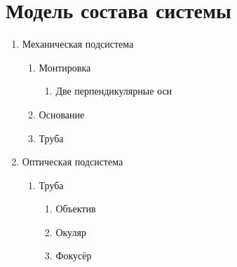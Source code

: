 \section{Модель состава системы}

\begin{enumerate}
\item Механическая подсистема
    \begin{enumerate}[label*=\arabic*.]
    \item Монтировка
        \begin{enumerate}[label*=\arabic*.]
        \item Две перпендикулярные оси
        \end{enumerate}
    \item Основание
    \item Труба
    \end{enumerate}
\item Оптическая подсистема
    \begin{enumerate}[label*=\arabic*.]
    \item Труба
        \begin{enumerate}[label*=\arabic*.]
        \item Объектив
        \item Окуляр
        \item Фокусёр
        \end{enumerate}
    \end{enumerate}
\end{enumerate}